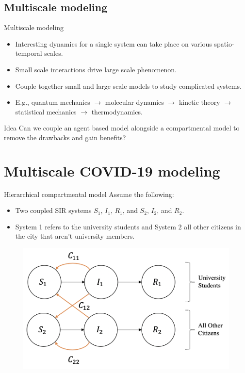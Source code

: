 \documentclass[aspectratio=169]{beamer}
\begin{document}
\subsection{Multiscale modeling}

\begin{frame}{Multiscale modeling}
    \vfill
    \begin{itemize}
    \pause
        \item Interesting dynamics for a single system can take place on various spatio-temporal scales.
        \pause
        \item Small scale interactions drive large scale phenomenon.
        \pause
        \item Couple together small and large scale models to study complicated systems.
        \pause
        \item E.g., quantum mechanics $\to$ molecular dynamics $\to$ kinetic theory $\to$ statistical mechanics $\to$ thermodynamics.
    \end{itemize}
    \vfill
\end{frame}

\begin{frame}{Idea}
    \vfill
    Can we couple an agent based model alongside a compartmental model to remove the drawbacks and gain benefits?
    \vfill
\end{frame}

\section{Multiscale COVID-19 modeling}

\begin{frame}{Hierarchical compartmental model}
\vfill
\pause
Assume the following:
    \begin{itemize}
    \pause
        \item Two coupled SIR systems $S_1$, $I_1$, $R_1$, and $S_2$, $I_2$, and $R_2$.
        \pause
        \item System 1 refers to the university students and System 2 all other citizens in the city that aren't university members.
        \pause
    \end{itemize}
        \begin{figure}[H]
            \centering
            \includegraphics[width=.6\textwidth]{figures/compartmental_sir.png}
        \end{figure}
        \vfill
\end{frame}
\end{document}
